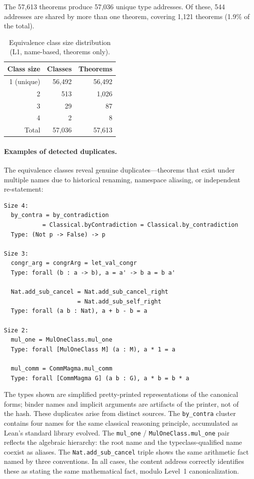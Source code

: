 The 57{,}613 theorems produce 57{,}036 unique type addresses.  Of
these, 544 addresses are shared by more than one theorem, covering
1{,}121 theorems (1.9\% of the total).

\begin{table}[h]
\centering
\begin{tabular}{@{}rrr@{}}
  \toprule
  \textbf{Class size} & \textbf{Classes} & \textbf{Theorems} \\
  \midrule
  1 (unique)  & 56{,}492 & 56{,}492 \\
  2           & 513      & 1{,}026 \\
  3           & 29       & 87 \\
  4           & 2        & 8 \\
  \midrule
  Total       & 57{,}036 & 57{,}613 \\
  \bottomrule
\end{tabular}
\caption{Equivalence class size distribution (L1, name-based, theorems only).}
\label{tab:eval}
\end{table}

\paragraph{Examples of detected duplicates.}
The equivalence classes reveal genuine duplicates---theorems that exist
under multiple names due to historical renaming, namespace aliasing, or
independent re-statement:

\begin{lstlisting}[style=output,caption={Selected equivalence classes (L1)}]
Size 4:
  by_contra = by_contradiction
           = Classical.byContradiction = Classical.by_contradiction
  Type: (Not p -> False) -> p

Size 3:
  congr_arg = congrArg = let_val_congr
  Type: forall (b : a -> b), a = a' -> b a = b a'

  Nat.add_sub_cancel = Nat.add_sub_cancel_right
                     = Nat.add_sub_self_right
  Type: forall (a b : Nat), a + b - b = a

Size 2:
  mul_one = MulOneClass.mul_one
  Type: forall [MulOneClass M] (a : M), a * 1 = a

  mul_comm = CommMagma.mul_comm
  Type: forall [CommMagma G] (a b : G), a * b = b * a
\end{lstlisting}

The types shown are simplified pretty-printed representations of the
canonical forms; binder names and implicit arguments are artifacts of
the printer, not of the hash.
These duplicates arise from distinct sources.  The \texttt{by\_contra}
cluster contains four names for the same classical reasoning principle,
accumulated as Lean's standard library evolved.  The \texttt{mul\_one} /
\texttt{MulOneClass.mul\_one} pair reflects the algebraic hierarchy: the
root name and the typeclass-qualified name coexist as aliases.  The
\texttt{Nat.add\_sub\_cancel} triple shows the same arithmetic fact
named by three conventions.  In all cases, the content address correctly
identifies these as stating the same mathematical fact, modulo Level~1
canonicalization.

